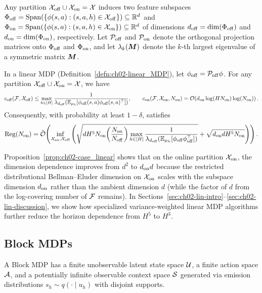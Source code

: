 Any partition ${\mathcal{X}}_{{\operatorname{off}}} \cup {\mathcal{X}}_{{\operatorname{on}}} = {\mathcal{X}}$ induces two feature subspaces $\Phi_{{\operatorname{off}}} = \operatorname{Span}(\{\phi(s, a) : (s, a, h) \in {\mathcal{X}}_{{\operatorname{off}}}\}) \subseteq {\mathbb{R}}^d$ and $\Phi_{{\operatorname{on}}} = \operatorname{Span}(\{\phi(s, a) : (s, a, h) \in {\mathcal{X}}_{{\operatorname{on}}}\}) \subseteq {\mathbb{R}}^d$ of dimensions $d_{{\operatorname{off}}} = \dim(\Phi_{{\operatorname{off}}})$ and $d_{{\operatorname{on}}} = \dim(\Phi_{{\operatorname{on}}})$, respectively. Let ${\mathcal{P}}_{{\operatorname{off}}}$ and ${\mathcal{P}}_{{\operatorname{on}}}$ denote the orthogonal projection matrices onto $\Phi_{{\operatorname{off}}}$ and $\Phi_{{\operatorname{on}}}$, and let $\lambda_k({\bm{M}})$ denote the $k$-th largest eigenvalue of a symmetric matrix ${\bm{M}}$.

\begin{prop}
\label{prop:ch02-case_linear}
In a linear MDP (Definition~\ref{defn:ch02-linear_MDP}), let $\phi_{{\operatorname{off}}} = {\mathcal{P}}_{{\operatorname{off}}} \phi$. For any partition ${\mathcal{X}}_{{\operatorname{off}}} \cup {\mathcal{X}}_{{\operatorname{on}}} = {\mathcal{X}}$, we have
\begin{equation}
    c_{{\operatorname{off}}}({\mathcal{F}}, {\mathcal{X}}_{{\operatorname{off}}}) \leq \max_{h \in [H]} \frac{1}{\lambda_{d_{{\operatorname{off}}}}\!\left(\mathbb{E}_{\mu_h}[\phi_{{\operatorname{off}}}(s, a)\phi_{{\operatorname{off}}}(s, a)^\top]\right)}, \qquad
    c_{{\operatorname{on}}}({\mathcal{F}}, {\mathcal{X}}_{{\operatorname{on}}}, N_{{\operatorname{on}}}) = {\mathcal{O}}\!\left(d_{{\operatorname{on}}} \log(H N_{{\operatorname{on}}}) \log(N_{{\operatorname{on}}})\right).
\end{equation}
Consequently, with probability at least $1-\delta$,  satisfies
\begin{equation}
    \operatorname{Reg}(N_{{\operatorname{on}}}) = \tilde{{\mathcal{O}}}\!\left(\inf_{{\mathcal{X}}_{{\operatorname{on}}}, {\mathcal{X}}_{{\operatorname{off}}}} \left(\sqrt{d H^5 N_{{\operatorname{on}}}\!\left(\frac{N_{{\operatorname{on}}}}{N_{{\operatorname{off}}}}\right)\max_{h \in [H]} \frac{1}{\lambda_{d_{{\operatorname{off}}}}(\mathbb{E}_{\mu_h}[ \phi_{{\operatorname{off}}}\phi_{{\operatorname{off}}}^\top])}}  + \sqrt{d_{{\operatorname{on}}} d H^5 N_{{\operatorname{on}}}}\right)\right).
\end{equation}
\end{prop}

Proposition~\ref{prop:ch02-case_linear} shows that on the online partition ${\mathcal{X}}_{{\operatorname{on}}}$, the dimension dependence improves from $d^2$ to $d_{{\operatorname{on}}} d$ because the restricted distributional Bellman--Eluder dimension on ${\mathcal{X}}_{{\operatorname{on}}}$ scales with the subspace dimension $d_{{\operatorname{on}}}$ rather than the ambient dimension $d$ (while the factor of $d$ from the log-covering number of ${\mathcal{F}}$ remains). In Sections~\ref{sec:ch02-lin-intro}--\ref{sec:ch02-lin-discussion}, we show how specialized variance-weighted linear MDP algorithms further reduce the horizon dependence from $H^5$ to $H^3$.

\subsection{Block MDPs}
A Block MDP \citep{dann2019oracleefficient, misra2019kinematic, du2021provably} has a finite unobservable latent state space ${\mathcal{U}}$, a finite action space ${\mathcal{A}}$, and a potentially infinite observable context space ${\mathcal{S}}$ generated via emission distributions $s_h \sim q(\cdot \mid u_h)$ with disjoint supports.

